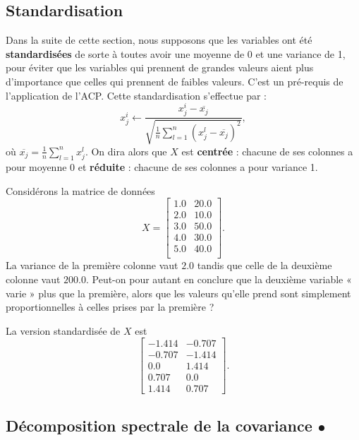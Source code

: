 \subsection{Standardisation}
Dans la suite de cette section, nous supposons que les variables ont été
\textbf{standardisées} de sorte à toutes avoir une moyenne de 0 et une variance
de 1, pour éviter que les variables qui prennent de grandes valeurs aient plus
d'importance que celles qui prennent de faibles valeurs. C'est un pré-requis de
l'application de l'ACP.  Cette standardisation s'effectue par :
\begin{equation}
  \label{eq:standardization}
  x^i_j \leftarrow \frac{x^i_j - \overline{x_j}}{\sqrt{\frac1n 
      \sum_{l=1}^n (x^l_j - \overline{x_j})^2}},
\end{equation}
où $\overline{x_j} = \frac1n \sum_{l=1}^n x^l_j.$ On dira alors que $X$ est
\textbf{centrée} : chacune de ses colonnes a pour moyenne 0 et \textbf{réduite} :
chacune de ses colonnes a pour variance 1.

\begin{exemple}
  Considérons la matrice de données 
  \[
    X = \begin{bmatrix} 1.0 & 20.0 \\
      2.0 & 10.0 \\
      3.0 & 50.0 \\
      4.0 & 30.0 \\
      5.0 & 40.0 \\
    \end{bmatrix}.
  \]
  La variance de la première colonne vaut $2.0$ tandis que celle de la deuxième
  colonne vaut $200.0$. Peut-on pour autant en conclure que la deuxième
  variable « varie » plus que la première, alors que les valeurs qu'elle prend
  sont simplement proportionnelles à celles prises par la première ?

  La version standardisée de $X$ est
  \[
    \begin{bmatrix} -1.414 & -0.707 \\
      -0.707 & -1.414 \\
      0.0 & 1.414 \\
      0.707 & 0.0 \\
      1.414 & 0.707 
    \end{bmatrix}.
  \]
\end{exemple}


\subsection{Décomposition spectrale de la covariance $\bullet$}
